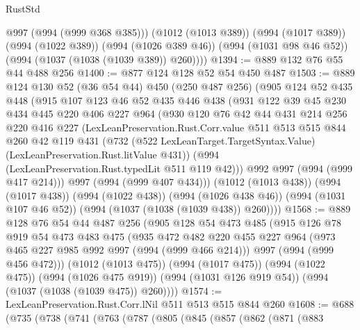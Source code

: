\begin{lexlean}{RustStd}
\begin{coremodule}
          @997
          (@994 (@999 @368 @385)))
        (@1012 (@1013 @389))
        (@994 (@1017 @389))
        (@994 (@1022 @389))
        (@994 (@1026 @389 @46))
        (@994 (@1031 @98 @46 @52))
        (@994 (@1037 (@1038 (@1039 @389)) @260))))
@1394 := @889 @132 @76 @55 @44 @488 @256
@1400 := @877 @124 @128 @52 @54 @450 @487
@1503 := @889
    @124
    @130
    @52
    (@36 @54 @44)
    @450
    (@250 @487 @256)
    (@905
      @124
      @52
      @435
      @448
      (@915
        @107
        @123
        @46
        @52
        @435
        @446
        @438
        (@931
          @122
          @39
          @45
          @230
          @434
          @445
          @220
          @406
          @227
          @964
          (@930
            @120
            @76
            @42
            @44
            @431
            @214
            @256
            @220
            @416
            @227
            (LexLeanPreservation.Rust.Corr.value
              @511
              @513
              @515
              @844
              @260
              @42
              @119
              @431
              (@732
                (@522 LexLeanTarget.TargetSyntax.Value)
                (LexLeanPreservation.Rust.litValue @431))
              (@994 (LexLeanPreservation.Rust.typedLit @511 @119 @42)))
            @992
            @997
            (@994 (@999 @417 @214)))
          @997
          (@994 (@999 @407 @434)))
        (@1012 (@1013 @438))
        (@994 (@1017 @438))
        (@994 (@1022 @438))
        (@994 (@1026 @438 @46))
        (@994 (@1031 @107 @46 @52))
        (@994 (@1037 (@1038 (@1039 @438)) @260))))
@1568 := @889
    @128
    @76
    @54
    @44
    @487
    @256
    (@905
      @128
      @54
      @473
      @485
      (@915
        @126
        @78
        @919
        @54
        @473
        @483
        @475
        (@935
          @472
          @482
          @220
          @455
          @227
          @964
          (@973 @465 @227 @985 @992 @997 (@994 (@999 @466 @214)))
          @997
          (@994 (@999 @456 @472)))
        (@1012 (@1013 @475))
        (@994 (@1017 @475))
        (@994 (@1022 @475))
        (@994 (@1026 @475 @919))
        (@994 (@1031 @126 @919 @54))
        (@994 (@1037 (@1038 (@1039 @475)) @260))))
@1574 := LexLeanPreservation.Rust.Corr.lNil @511 @513 @515 @844 @260
@1608 := @688
    (@735
      (@738
        (@741
          (@763
            (@787
              (@805
                (@845
                  (@857
                    (@862
                      (@871
                        (@883

\end{coremodule}
\end{lexlean}
